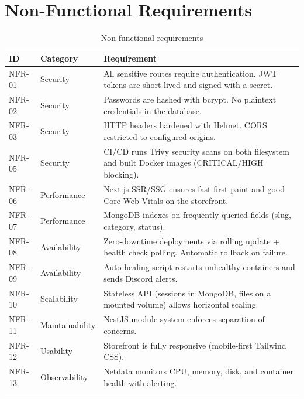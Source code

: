 \section{Non-Functional Requirements}

\begin{longtable}{|m{1.5cm}|m{2.5cm}|m{9cm}|}
    \hline
    \textbf{ID} & \textbf{Category} & \textbf{Requirement}                                                                                 \\
    \hline
    \endhead
    \endfoot
    \endlastfoot
    \hline
    NFR-01      & Security          & All sensitive routes require authentication. JWT tokens are short-lived and signed with a secret.    \\
    \hline
    NFR-02      & Security          & Passwords are hashed with bcrypt. No plaintext credentials in the database.                          \\
    \hline
    NFR-03      & Security          & HTTP headers hardened with Helmet. CORS restricted to configured origins.                            \\
    \hline
    NFR-05      & Security          & CI/CD runs Trivy security scans on both filesystem and built Docker images (CRITICAL/HIGH blocking). \\
    \hline
    NFR-06      & Performance       & Next.js SSR/SSG ensures fast first-paint and good Core Web Vitals on the storefront.                 \\
    \hline
    NFR-07      & Performance       & MongoDB indexes on frequently queried fields (slug, category, status).                               \\
    \hline
    NFR-08      & Availability      & Zero-downtime deployments via rolling update + health check polling. Automatic rollback on failure.  \\
    \hline
    NFR-09      & Availability      & Auto-healing script restarts unhealthy containers and sends Discord alerts.                          \\
    \hline
    NFR-10      & Scalability       & Stateless API (sessions in MongoDB, files on a mounted volume) allows horizontal scaling.            \\
    \hline
    NFR-11      & Maintainability   & NestJS module system enforces separation of concerns.                                                \\
    \hline
    NFR-12      & Usability         & Storefront is fully responsive (mobile-first Tailwind CSS).                                          \\
    \hline
    NFR-13      & Observability     & Netdata monitors CPU, memory, disk, and container health with alerting.                              \\
    \hline
    \caption{Non-functional requirements}
    \label{tab:nfr}
\end{longtable}

